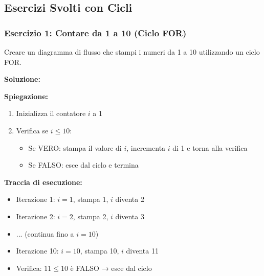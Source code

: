 \documentclass[a4paper,16pt]{article}
\begin{document}
\newpage
\subsection{Esercizi Svolti con Cicli}

\subsubsection{Esercizio 1: Contare da 1 a 10 (Ciclo FOR)}

\begin{tcolorbox}[colback=blue!5!white,colframe=blue!75!black,title=Traccia]
Creare un diagramma di flusso che stampi i numeri da 1 a 10 utilizzando un ciclo FOR.
\end{tcolorbox}

\textbf{Soluzione:}

\begin{center}
\end{center}

\textbf{Spiegazione:}
\begin{enumerate}
    \item Inizializza il contatore $i$ a 1
    \item Verifica se $i \leq 10$:
    \begin{itemize}
        \item Se VERO: stampa il valore di $i$, incrementa $i$ di 1 e torna alla verifica
        \item Se FALSO: esce dal ciclo e termina
    \end{itemize}
\end{enumerate}

\textbf{Traccia di esecuzione:}
\begin{itemize}
    \item Iterazione 1: $i=1$, stampa 1, $i$ diventa 2
    \item Iterazione 2: $i=2$, stampa 2, $i$ diventa 3
    \item ... (continua fino a $i=10$)
    \item Iterazione 10: $i=10$, stampa 10, $i$ diventa 11
    \item Verifica: $11 \leq 10$ è FALSO → esce dal ciclo
\end{itemize}
\end{document}
